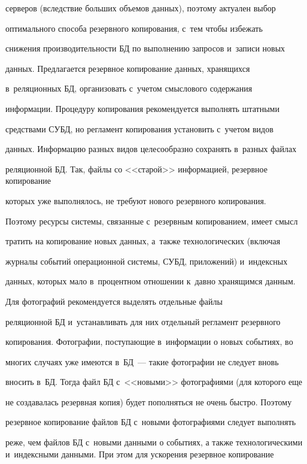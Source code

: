 серверов (вследствие больших объемов данных), поэтому актуален выбор 


оптимального способа резервного копирования, с~тем чтобы избежать 


снижения производительности БД по выполнению запросов и~записи новых 


данных. Предлагается резервное копирование данных, хранящихся 


в~реляционных БД, организовать с~учетом смыслового содержания 


информации. Процедуру копирования рекомендуется выполнять штатными 


средствами СУБД, но регламент копирования установить с~учетом видов 


данных. Информацию разных видов целесообразно сохранять в~разных файлах 


реляционной БД. Так, файлы со <<старой>> информацией, резервное копирование 


которых уже выполнялось, не требуют нового резервного копирования. 


Поэтому ресурсы системы, связанные с~резервным копированием, имеет смысл 


тратить на копирование новых данных, а~также технологических (включая 


журналы событий операционной системы, СУБД, приложений) и~индексных 


данных, которых мало в~процентном отношении к~давно хранящимся данным. 


      


      Для фотографий рекомендуется выделять отдельные файлы 


реляционной БД и~устанавливать для них отдельный регламент резервного 


копирования. Фотографии, поступающие в~информации о новых событиях, во 


многих случаях уже имеются в~БД~--- такие фотографии не следует вновь 


вносить в~БД. Тогда файл БД с~<<новыми>> фотографиями (для которого еще 


не создавалась резервная копия) будет пополняться не очень быст\-ро. Поэтому 


резервное копирование файлов БД с~новыми фотографиями следует выполнять 


реже, чем файлов БД с~новыми данными о событиях, а также технологическими и~индексными данными. При этом для ускорения резервное копирование 


